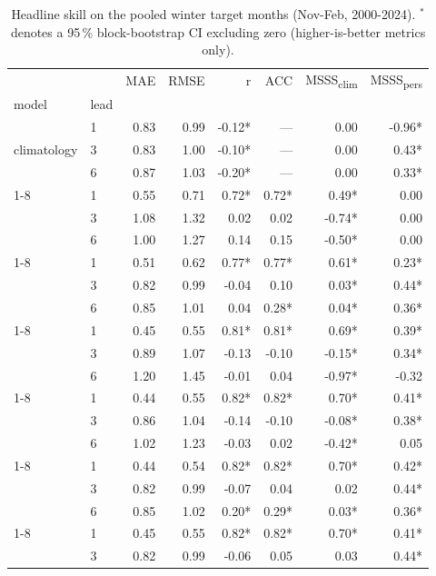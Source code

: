 \begin{table}
\caption{Headline skill on the pooled winter target months (Nov-Feb, 2000-2024). $^*$ denotes a 95\,\% block-bootstrap CI excluding zero (higher-is-better metrics only).}
\label{tab:headline_skill}
\begin{tabular}{llrrrrrr}
\toprule
 &  & MAE & RMSE & r & ACC & MSSS\textsubscript{clim} & MSSS\textsubscript{pers} \\
model & lead &  &  &  &  &  &  \\
\midrule
\multirow[t]{3}{*}{climatology} & 1 & 0.83 & 0.99 & -0.12* & --- & 0.00 & -0.96* \\
 & 3 & 0.83 & 1.00 & -0.10* & --- & 0.00 & 0.43* \\
 & 6 & 0.87 & 1.03 & -0.20* & --- & 0.00 & 0.33* \\
\cline{1-8}
\multirow[t]{3}{*}{persistence} & 1 & 0.55 & 0.71 & 0.72* & 0.72* & 0.49* & 0.00 \\
 & 3 & 1.08 & 1.32 & 0.02 & 0.02 & -0.74* & 0.00 \\
 & 6 & 1.00 & 1.27 & 0.14 & 0.15 & -0.50* & 0.00 \\
\cline{1-8}
\multirow[t]{3}{*}{ar} & 1 & 0.51 & 0.62 & 0.77* & 0.77* & 0.61* & 0.23* \\
 & 3 & 0.82 & 0.99 & -0.04 & 0.10 & 0.03* & 0.44* \\
 & 6 & 0.85 & 1.01 & 0.04 & 0.28* & 0.04* & 0.36* \\
\cline{1-8}
\multirow[t]{3}{*}{ols} & 1 & 0.45 & 0.55 & 0.81* & 0.81* & 0.69* & 0.39* \\
 & 3 & 0.89 & 1.07 & -0.13 & -0.10 & -0.15* & 0.34* \\
 & 6 & 1.20 & 1.45 & -0.01 & 0.04 & -0.97* & -0.32 \\
\cline{1-8}
\multirow[t]{3}{*}{ridge} & 1 & 0.44 & 0.55 & 0.82* & 0.82* & 0.70* & 0.41* \\
 & 3 & 0.86 & 1.04 & -0.14 & -0.10 & -0.08* & 0.38* \\
 & 6 & 1.02 & 1.23 & -0.03 & 0.02 & -0.42* & 0.05 \\
\cline{1-8}
\multirow[t]{3}{*}{lasso} & 1 & 0.44 & 0.54 & 0.82* & 0.82* & 0.70* & 0.42* \\
 & 3 & 0.82 & 0.99 & -0.07 & 0.04 & 0.02 & 0.44* \\
 & 6 & 0.85 & 1.02 & 0.20* & 0.29* & 0.03* & 0.36* \\
\cline{1-8}
\multirow[t]{3}{*}{elasticnet} & 1 & 0.45 & 0.55 & 0.82* & 0.82* & 0.70* & 0.41* \\
 & 3 & 0.82 & 0.99 & -0.06 & 0.05 & 0.03 & 0.44* \\

\end{tabular}
\end{table}
